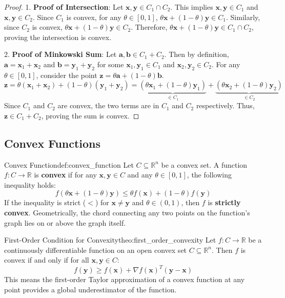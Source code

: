 \documentclass{MathNote}
\begin{document}
\begin{proof}
	1. \textbf{Proof of Intersection}: Let $\bm{x}, \bm{y} \in C_1 \cap C_2$. This implies $\bm{x}, \bm{y} \in C_1$ and $\bm{x}, \bm{y} \in C_2$. Since $C_1$ is convex, for any $\theta \in [0, 1]$, $\theta \bm{x} + (1 - \theta)\bm{y} \in C_1$. Similarly, since $C_2$ is convex, $\theta \bm{x} + (1 - \theta)\bm{y} \in C_2$. Therefore, $\theta \bm{x} + (1 - \theta)\bm{y} \in C_1 \cap C_2$, proving the intersection is convex.
	
	2. \textbf{Proof of Minkowski Sum}: Let $\bm{a}, \bm{b} \in C_1+C_2$. Then by definition, $\bm{a} = \bm{x}_1+\bm{x}_2$ and $\bm{b} = \bm{y}_1+\bm{y}_2$ for some $\bm{x}_1, \bm{y}_1 \in C_1$ and $\bm{x}_2, \bm{y}_2 \in C_2$. For any $\theta \in [0,1]$, consider the point $\bm{z} = \theta \bm{a} + (1-\theta)\bm{b}$.
	$$ \bm{z} = \theta(\bm{x}_1+\bm{x}_2) + (1-\theta)(\bm{y}_1+\bm{y}_2) = \underbrace{(\theta \bm{x}_1 + (1-\theta)\bm{y}_1)}_{\in C_1} + \underbrace{(\theta \bm{x}_2 + (1-\theta)\bm{y}_2)}_{\in C_2} $$
	Since $C_1$ and $C_2$ are convex, the two terms are in $C_1$ and $C_2$ respectively. Thus, $\bm{z} \in C_1+C_2$, proving the sum is convex.
\end{proof}


\subsection{Convex Functions}

\begin{definition}{Convex Function}{def:convex_function}
	Let $C \subseteq \mathbb{R}^n$ be a convex set. A function $f: C \to \mathbb{R}$ is \textbf{convex} if for any $\bm{x}, \bm{y} \in C$ and any $\theta \in [0, 1]$, the following inequality holds:
	$$
	f(\theta \bm{x} + (1 - \theta)\bm{y}) \le \theta f(\bm{x}) + (1 - \theta) f(\bm{y})
	$$
	If the inequality is strict ($<$) for $\bm{x} \ne \bm{y}$ and $\theta \in (0,1)$, then $f$ is \textbf{strictly convex}. Geometrically, the chord connecting any two points on the function's graph lies on or above the graph itself.
\end{definition}

\begin{theorem}{First-Order Condition for Convexity}{theo:first_order_convexity}
	Let $f: C \to \mathbb{R}$ be a continuously differentiable function on an open convex set $C \subseteq \mathbb{R}^n$. Then $f$ is convex if and only if for all $\bm{x}, \bm{y} \in C$:
	$$
	f(\bm{y}) \ge f(\bm{x}) + \nabla f(\bm{x})^T (\bm{y} - \bm{x})
	$$
	This means the first-order Taylor approximation of a convex function at any point provides a global underestimator of the function.
\end{theorem}
\end{document}
